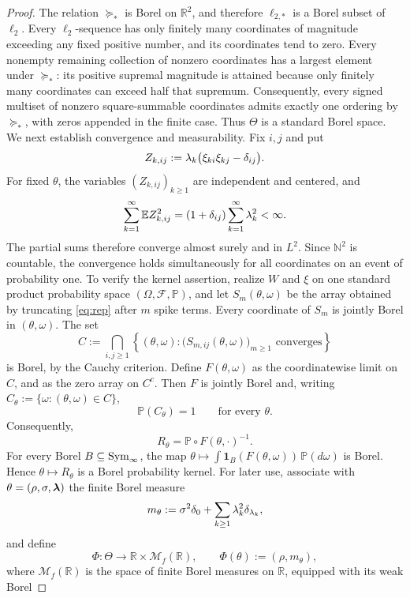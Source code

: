 \begin{proof}
The relation \(\succeq_*\) is Borel on \(\mathbb R^2\), and therefore
\(\ell_{2,*}\) is a Borel subset of \(\ell_2\). Every
\(\ell_2\)-sequence has only finitely many coordinates of magnitude
exceeding any fixed positive number, and its coordinates tend to
zero. Every nonempty remaining collection of nonzero coordinates has
a largest element under \(\succeq_*\): its positive supremal
magnitude is attained because only finitely many coordinates can
exceed half that supremum. Consequently, every signed multiset of
nonzero square-summable coordinates admits exactly one ordering by
\(\succeq_*\), with zeros appended in the finite case. Thus
\(\Theta\) is a standard Borel space.
We next establish convergence and measurability. Fix \(i,j\) and put
\[
Z_{k,ij}
:=
\lambda_k\bigl(\xi_{ki}\xi_{kj}-\delta_{ij}\bigr).
\]
For fixed \(\theta\), the variables \((Z_{k,ij})_{k\geq1}\) are
independent and centered, and
\[
\sum_{k=1}^{\infty}\mathbb E Z_{k,ij}^2
=
(1+\delta_{ij})
\sum_{k=1}^{\infty}\lambda_k^2
<\infty.
\]
The partial sums therefore converge almost surely and in \(L^2\).
Since \(\mathbb N^2\) is countable, the convergence holds
simultaneously for all coordinates on an event of probability one.
To verify the kernel assertion, realize \(W\) and \(\xi\) on one
standard product probability space
\((\Omega,\mathcal F,\mathbb P)\), and let
\(S_m(\theta,\omega)\) be the array obtained by truncating
\eqref{eq:rep} after \(m\) spike terms. Every coordinate of \(S_m\)
is jointly Borel in \((\theta,\omega)\). The set
\[
C
:=
\bigcap_{i,j\geq1}
\left\{
(\theta,\omega):
\bigl(S_{m,ij}(\theta,\omega)\bigr)_{m\geq1}
\text{ converges}
\right\}
\]
is Borel, by the Cauchy criterion. Define \(F(\theta,\omega)\) as the
coordinatewise limit on \(C\), and as the zero array on \(C^c\).
Then \(F\) is jointly Borel and, writing
\(C_\theta:=\{\omega:(\theta,\omega)\in C\}\),
\[
\mathbb P(C_\theta)=1
\qquad\text{for every }\theta.
\]
Consequently,
\[
R_\theta
=
\mathbb P\circ F(\theta,\cdot)^{-1}.
\]
For every Borel \(B\subseteq\mathrm{Sym}_\infty\), the map
\(\theta\mapsto\int \mathbf 1_B(F(\theta,\omega))\,\mathbb P(d\omega)\)
is Borel. Hence \(\theta\mapsto R_\theta\) is a Borel probability
kernel.
For later use, associate with
\(\theta=(\rho,\sigma,\bm{\lambda})\) the finite Borel measure
\[
m_\theta
:=
\sigma^2\delta_0
+\sum_{k\geq1}\lambda_k^2\delta_{\lambda_k},
\]
and define
\[
\Phi:
\Theta
\longrightarrow
\mathbb R\times\mathcal M_f(\mathbb R),
\qquad
\Phi(\theta):=(\rho,m_\theta),
\]
where \(\mathcal M_f(\mathbb R)\) is the space of finite Borel
measures on \(\mathbb R\), equipped with its weak Borel

\end{proof}

